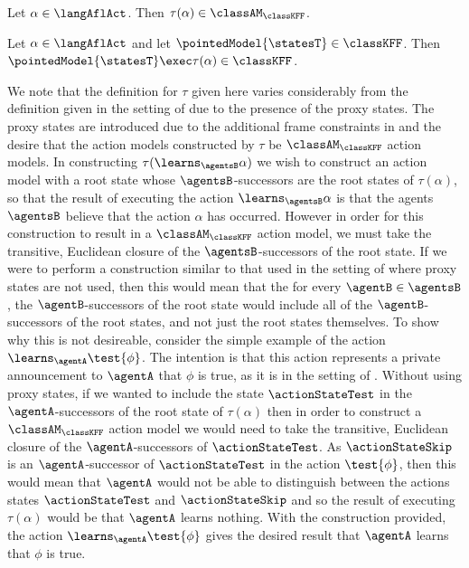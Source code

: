 \documentclass[twoside]{aiml14}
\begin{document}
  \begin{lemma}\label{afl-kff-structure}
      Let $\alpha \in \langAflAct$. Then $\tau(\alpha) \in \classAM_\classKFF$.
  \end{lemma}

  \begin{lemma}\label{afl-kff-exec}
      Let $\alpha \in \langAflAct$ and 
      let $\pointedModel{\statesT} \in \classKFF$.
      Then $\pointedModel{\statesT} \exec \tau(\alpha) \in \classKFF$.
  \end{lemma}

  We note that the definition for $\tau$ given here varies considerably from
  the definition given in the setting of \classK{} due to the presence of the
  proxy states.  The proxy states are introduced due to the additional frame
  constraints in \classKFF{} and the desire that the action models constructed
  by $\tau$ be $\classAM_\classKFF$ action models. In constructing
  $\tau(\learns_\agentsB \alpha)$ we wish to construct an action model with a
  root state whose $\agentsB$-successors are the root states of $\tau(\alpha)$,
  so that the result of executing the action $\learns_\agentsB \alpha$ is that
  the agents $\agentsB$ believe that the action $\alpha$ has occurred. However
  in order for this construction to result in a $\classAM_\classKFF$ action
  model, we must take the transitive, Euclidean closure of the
  $\agentsB$-successors of the root state. If we were to perform a construction
  similar to that used in the setting of \classK{} where proxy states are not
  used, then this would mean that the for every $\agentB \in \agentsB$, the
  $\agentB$-successors of the root state would include all of the
  $\agentB$-successors of the root states, and not just the root states
  themselves. To show why this is not desireable, consider the simple example
  of the action $\learns_\agentA \test{\phi}$. The intention is that this
  action represents a private announcement to $\agentA$ that $\phi$ is true, as
  it is in the setting of \classK{}. Without using proxy states, if we wanted to
  include the state $\actionStateTest$ in the $\agentA$-successors of the root
  state of $\tau(\alpha)$ then in order to construct a $\classAM_\classKFF$
  action model we would need to take the transitive, Euclidean closure of the
  $\agentA$-successors of $\actionStateTest$. As $\actionStateSkip$ is an
  $\agentA$-successor of $\actionStateTest$ in the action $\test{\phi}$, then
  this would mean that $\agentA$ would not be able to distinguish between the
  actions states $\actionStateTest$ and $\actionStateSkip$ and so the result of
  executing $\tau(\alpha)$ would be that $\agentA$ learns nothing. With the
  construction provided, the action $\learns_\agentA \test{\phi}$ gives the
  desired result that $\agentA$ learns that $\phi$ is true.
\end{document}
